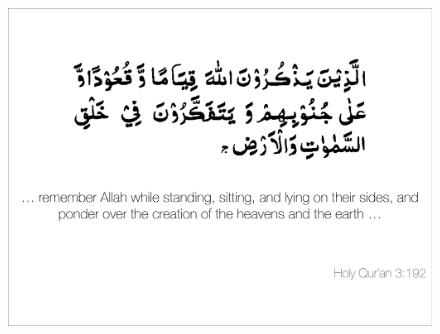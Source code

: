 \documentclass[11pt,a4paper]{report}      %
\begin{document}


 \thesistitlepage                     %

\newpage
\thispagestyle{empty}
\vfill
  \begin{figure}
  \centering
  \includegraphics[width=1\textwidth]{pics/Verse.pdf}
  \end{figure}
  \vfill


\tableofcontents                     %
\end{document}
